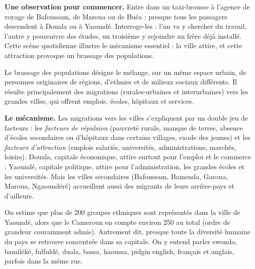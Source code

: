 \documentclass[11pt]{article}
\newcommand{\cle}[1]{{\popxbold\color{popdark}#1}}
\begin{document}
\textbf{Une observation pour commencer.} Entre dans un taxi-brousse à l'agence de voyage de Bafoussam, de Maroua ou de Buéa : presque tous les passagers descendent à Douala ou à Yaoundé. Interroge-les : l'un va y chercher du travail, l'autre y poursuivre des études, un troisième y rejoindre un frère déjà installé. Cette scène quotidienne illustre le mécanisme essentiel : la ville attire, et cette attraction provoque un \cle{brassage des populations}.

\begin{definition}
Le \cle{brassage des populations} désigne le mélange, sur un même espace urbain, de personnes originaires de régions, d'ethnies et de milieux sociaux différents. Il résulte principalement des \cle{migrations} (rurales-urbaines et interurbaines) vers les grandes villes, qui offrent emplois, écoles, hôpitaux et services.
\end{definition}

\textbf{Le mécanisme.} Les migrations vers les villes s'expliquent par un double jeu de facteurs : les \emph{facteurs de répulsion} (pauvreté rurale, manque de terres, absence d'écoles secondaires ou d'hôpitaux dans certains villages, exode des jeunes) et les \emph{facteurs d'attraction} (emplois salariés, universités, administrations, marchés, loisirs). Douala, capitale économique, attire surtout pour l'emploi et le commerce ; Yaoundé, capitale politique, attire pour l'administration, les grandes écoles et les universités. Mais les villes secondaires (Bafoussam, Bamenda, Garoua, Maroua, Ngaoundéré) accueillent aussi des migrants de leurs arrière-pays et d'ailleurs.

\begin{exemplebox}
On estime que plus de \cle{200 groupes ethniques} sont représentés dans la ville de Yaoundé, alors que le Cameroun en compte environ 250 au total (ordre de grandeur couramment admis). Autrement dit, presque toute la diversité humaine du pays se retrouve concentrée dans sa capitale. On y entend parler ewondo, bamiléké, fulfuldé, duala, bassa, haoussa, pidgin english, français et anglais, parfois dans la même rue.
\end{exemplebox}
\end{document}

